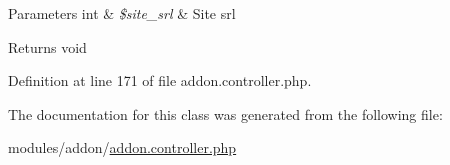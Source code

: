 \begin{DoxyParams}[1]{Parameters}
int & {\em \$site\+\_\+srl} & Site srl \\
\hline
\end{DoxyParams}
\begin{DoxyReturn}{Returns}
void 
\end{DoxyReturn}


Definition at line 171 of file addon.\+controller.\+php.



The documentation for this class was generated from the following file\+:\begin{DoxyCompactItemize}
\item 
modules/addon/\hyperlink{addon_8controller_8php}{addon.\+controller.\+php}\end{DoxyCompactItemize}
